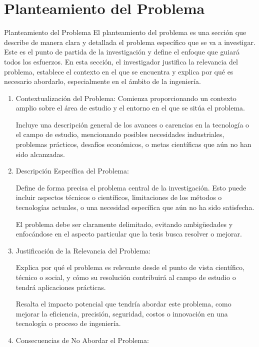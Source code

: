 \documentclass[9pt]{beamer}
\begin{document}
\section{Planteamiento del Problema}
\begin{frame}{Planteamiento del Problema}
El planteamiento del problema es una sección que describe de manera clara y detallada el problema específico que se va a investigar. Este es el punto de partida de la investigación y define el enfoque que guiará todos los esfuerzos. En esta sección, el investigador justifica la relevancia del problema, establece el contexto en el que se encuentra y explica por qué es necesario abordarlo, especialmente en el ámbito de la ingeniería.

\begin{enumerate}
    \item Contextualización del Problema:
    Comienza proporcionando un contexto amplio sobre el área de estudio y el entorno en el que se sitúa el problema.

    Incluye una descripción general de los avances o carencias en la tecnología o el campo de estudio, mencionando posibles necesidades industriales, problemas prácticos, desafíos económicos, o metas científicas que aún no han sido alcanzadas.

    \item Descripción Específica del Problema:

    Define de forma precisa el problema central de la investigación. Esto puede incluir aspectos técnicos o científicos, limitaciones de los métodos o tecnologías actuales, o una necesidad específica que aún no ha sido satisfecha.

    El problema debe ser claramente delimitado, evitando ambigüedades y enfocándose en el aspecto particular que la tesis busca resolver o mejorar.

    \item Justificación de la Relevancia del Problema:

    Explica por qué el problema es relevante desde el punto de vista científico, técnico o social, y cómo su resolución contribuirá al campo de estudio o tendrá aplicaciones prácticas.

    Resalta el impacto potencial que tendría abordar este problema, como mejorar la eficiencia, precisión, seguridad, costos o innovación en una tecnología o proceso de ingeniería.

    \item Consecuencias de No Abordar el Problema:


\end{enumerate}
\end{frame}
\end{document}
